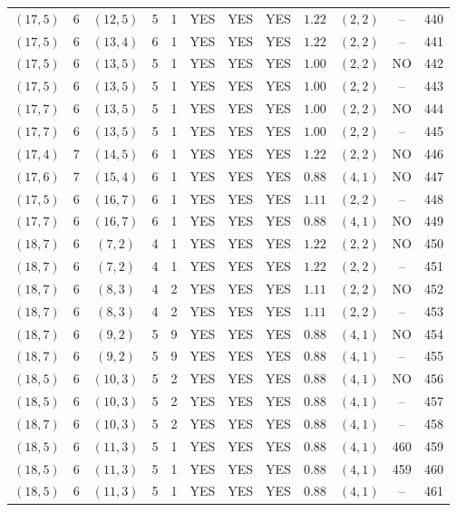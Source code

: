 \begin{longtable}{|c|c|c|c|c|c|c|c|c|c|c|c|}
$(17,5)$ & 6 & $(12,5)$ & 5 & 1 & YES & YES & YES & $1.22$ & $(2,2)$ & -- & 440\\
$(17,5)$ & 6 & $(13,4)$ & 6 & 1 & YES & YES & YES & $1.22$ & $(2,2)$ & -- & 441\\
$(17,5)$ & 6 & $(13,5)$ & 5 & 1 & YES & YES & YES & $1.00$ & $(2,2)$ & NO & 442\\
$(17,5)$ & 6 & $(13,5)$ & 5 & 1 & YES & YES & YES & $1.00$ & $(2,2)$ & -- & 443\\
$(17,7)$ & 6 & $(13,5)$ & 5 & 1 & YES & YES & YES & $1.00$ & $(2,2)$ & NO & 444\\
$(17,7)$ & 6 & $(13,5)$ & 5 & 1 & YES & YES & YES & $1.00$ & $(2,2)$ & -- & 445\\
$(17,4)$ & 7 & $(14,5)$ & 6 & 1 & YES & YES & YES & $1.22$ & $(2,2)$ & NO & 446\\
$(17,6)$ & 7 & $(15,4)$ & 6 & 1 & YES & YES & YES & $0.88$ & $(4,1)$ & NO & 447\\
$(17,5)$ & 6 & $(16,7)$ & 6 & 1 & YES & YES & YES & $1.11$ & $(2,2)$ & -- & 448\\
$(17,7)$ & 6 & $(16,7)$ & 6 & 1 & YES & YES & YES & $0.88$ & $(4,1)$ & NO & 449\\
$(18,7)$ & 6 & $(7,2)$ & 4 & 1 & YES & YES & YES & $1.22$ & $(2,2)$ & NO & 450\\
$(18,7)$ & 6 & $(7,2)$ & 4 & 1 & YES & YES & YES & $1.22$ & $(2,2)$ & -- & 451\\
$(18,7)$ & 6 & $(8,3)$ & 4 & 2 & YES & YES & YES & $1.11$ & $(2,2)$ & NO & 452\\
$(18,7)$ & 6 & $(8,3)$ & 4 & 2 & YES & YES & YES & $1.11$ & $(2,2)$ & -- & 453\\
$(18,7)$ & 6 & $(9,2)$ & 5 & 9 & YES & YES & YES & $0.88$ & $(4,1)$ & NO & 454\\
$(18,7)$ & 6 & $(9,2)$ & 5 & 9 & YES & YES & YES & $0.88$ & $(4,1)$ & -- & 455\\
$(18,5)$ & 6 & $(10,3)$ & 5 & 2 & YES & YES & YES & $0.88$ & $(4,1)$ & NO & 456\\
$(18,5)$ & 6 & $(10,3)$ & 5 & 2 & YES & YES & YES & $0.88$ & $(4,1)$ & -- & 457\\
$(18,7)$ & 6 & $(10,3)$ & 5 & 2 & YES & YES & YES & $0.88$ & $(4,1)$ & -- & 458\\
$(18,5)$ & 6 & $(11,3)$ & 5 & 1 & YES & YES & YES & $0.88$ & $(4,1)$ & 460 & 459\\
$(18,5)$ & 6 & $(11,3)$ & 5 & 1 & YES & YES & YES & $0.88$ & $(4,1)$ & 459 & 460\\
$(18,5)$ & 6 & $(11,3)$ & 5 & 1 & YES & YES & YES & $0.88$ & $(4,1)$ & -- & 461\\

\end{longtable}

